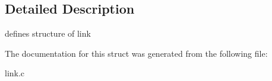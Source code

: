 \subsection{Detailed Description}
defines structure of link 

The documentation for this struct was generated from the following file\+:\begin{DoxyCompactItemize}
\item 
link.\+c\end{DoxyCompactItemize}
